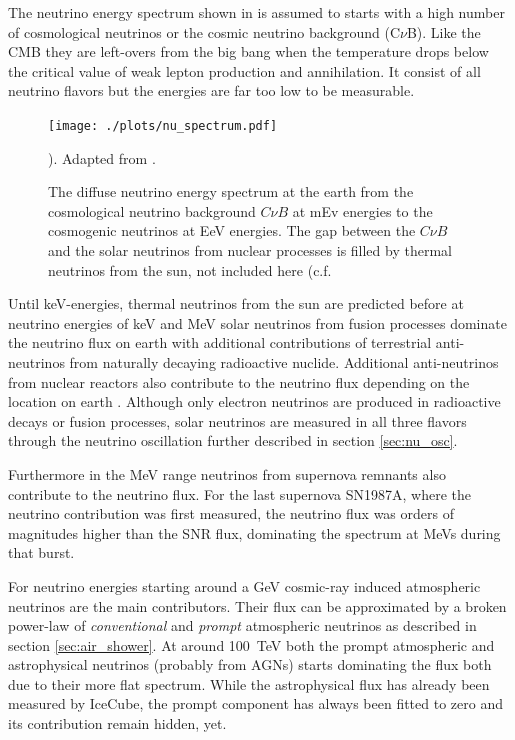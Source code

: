 The neutrino energy spectrum shown in  is assumed to starts with a high number of cosmological neutrinos or the cosmic neutrino background (C$\nu$B).
Like the CMB they are left-overs from the big bang when the temperature drops below the critical value of weak lepton production and annihilation.
It consist of all neutrino flavors but the energies are far too low to be measurable.
\begin{figure}
    \centering
    \texttt{[image: ./plots/nu\_spectrum.pdf]}
    \caption{The diffuse neutrino energy spectrum at the earth from the cosmological neutrino background $C\nu B$ at mEv energies to the cosmogenic neutrinos at EeV energies. The gap between the $C\nu B$ and the solar neutrinos from nuclear processes is filled by thermal neutrinos from the sun, not included here (c.f. \cite{Vitagliano20}}). Adapted from \cite{KatzSpiering12}.
    \label{fig:neutrino_spectrum}
\end{figure}

Until keV-energies, thermal neutrinos from the sun are predicted \cite{Vitagliano20} before at neutrino energies of keV and MeV solar neutrinos from fusion processes dominate the neutrino flux on earth with additional contributions of terrestrial anti-neutrinos from naturally decaying radioactive nuclide.
Additional anti-neutrinos from nuclear reactors also contribute to the neutrino flux depending on the location on earth \cite{Usman15}.
Although only electron neutrinos are produced in radioactive decays or fusion processes, solar neutrinos are measured in all three flavors through the neutrino oscillation further described in section \ref{sec:nu_osc}.

Furthermore in the MeV range neutrinos from supernova remnants also contribute to the neutrino flux.
For the last supernova SN1987A, where the neutrino contribution was first measured, the neutrino flux was orders of magnitudes higher than the SNR flux, dominating the spectrum at MeVs during that burst.

For neutrino energies starting around a GeV cosmic-ray induced atmospheric neutrinos are the main contributors.
Their flux can be approximated by a broken power-law of \textit{conventional} and \textit{prompt} atmospheric neutrinos as described in section \ref{sec:air_shower}.
At around \SI{100}{TeV} both the prompt atmospheric and astrophysical neutrinos (probably from AGNs) starts dominating the flux both due to their more flat spectrum.
While the astrophysical flux has already been measured by IceCube, the prompt component has always been fitted to zero and its contribution remain hidden, yet.

